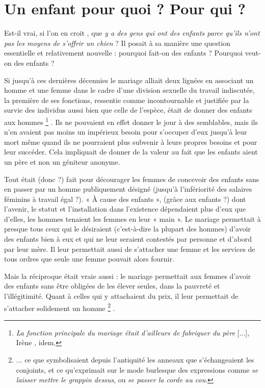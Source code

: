 
\chapter{Un enfant pour quoi ? Pour qui ?}


Est-il vrai, si l'on en croit , que {\emph{y a des gens qui ont des enfants parce qu'ils n'ont pas les moyens de s'offrir un chien}} ? Il posait à sa manière une question essentielle et relativement nouvelle : pourquoi fait-on des enfants ? Pourquoi veut-on des enfants ?

 Si jusqu'à ces dernières décennies le mariage alliait deux lignées en associant un homme et une femme dans le cadre d'une division sexuelle du travail indiscutée, la première de ses fonctions, ressentie comme incontournable et justifiée par la survie des individus aussi bien que celle de l'espèce, était de donner des enfants aux hommes%
\footnote{{\emph{La fonction principale du mariage était d'ailleurs de fabriquer du père} [...]}, Irène , idem.}%
. Ils ne pouvaient en effet donner le jour à des semblables, mais ils n'en avaient pas moins un impérieux besoin pour s'occuper d'eux jusqu'à leur mort même quand ils ne pourraient plus subvenir à leurs propres besoins et pour leur succéder. Cela impliquait de donner de la valeur au fait que les enfants aient un père et non un géniteur anonyme. 
 
 Tout était (donc ?) fait pour décourager les femmes de concevoir des enfants sans en passer par un homme publiquement désigné (jusqu'à l'infériorité des salaires féminins à travail égal ?). « À cause des enfants », (grâce aux enfants ?) dont l'avenir, le statut et l'installation dans l'existence dépendaient plus d'eux que d'elles, les hommes tenaient les femmes en leur « main ». Le mariage permettait à presque tous ceux qui le désiraient (c'est-à-dire la plupart des hommes) d'avoir des enfants bien à eux et qui ne leur seraient contestés par personne et d'abord par leur mère. Il leur permettait aussi de s'attacher une femme et les services de tous ordres que seule une femme pouvait alors fournir. 
 
 Mais la réciproque était vraie aussi : le mariage permettait aux femmes d'avoir des enfants sans être obligées de les élever seules, dans la pauvreté et l'illégitimité. Quant à celles qui y attachaient du prix, il leur permettait de s'attacher solidement un homme%
\footnote{... ce que symbolisaient depuis l'antiquité les anneaux que s'échangeaient les conjoints, et ce qu'exprimait sur le mode burlesque des expressions comme {\emph{se laisser mettre le grappin dessus}}, ou {\emph{se passer la corde au cou}}.}%
. 
 
